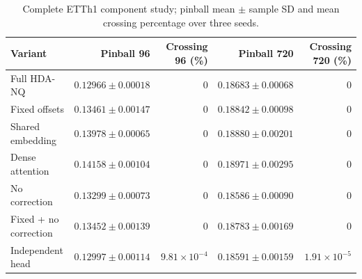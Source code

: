 \begin{table}[t]
\centering\small
\caption{Complete ETTh1 component study; pinball mean $\pm$ sample SD and mean crossing percentage over three seeds.}
\label{tab:full-ablation}
\begin{tabular}{@{}lrrrr@{}}
\toprule
Variant & Pinball 96 & Crossing 96 (\%) & Pinball 720 & Crossing 720 (\%) \\
\midrule
Full HDA-NQ & $0.12966\pm0.00018$ & $0$ & $0.18683\pm0.00068$ & $0$ \\
Fixed offsets & $0.13461\pm0.00147$ & $0$ & $0.18842\pm0.00098$ & $0$ \\
Shared embedding & $0.13978\pm0.00065$ & $0$ & $0.18880\pm0.00201$ & $0$ \\
Dense attention & $0.14158\pm0.00104$ & $0$ & $0.18971\pm0.00295$ & $0$ \\
No correction & $0.13299\pm0.00073$ & $0$ & $0.18586\pm0.00090$ & $0$ \\
Fixed + no correction & $0.13452\pm0.00139$ & $0$ & $0.18783\pm0.00169$ & $0$ \\
Independent head & $0.12997\pm0.00114$ & $9.81\times10^{-4}$ & $0.18591\pm0.00159$ & $1.91\times10^{-5}$ \\
\bottomrule
\end{tabular}
\end{table}
